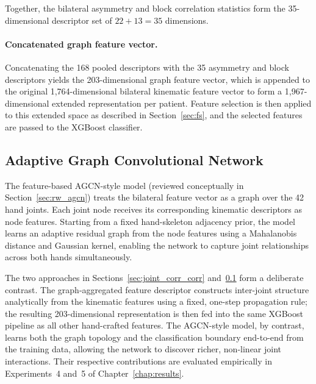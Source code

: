 Together, the bilateral asymmetry and block correlation statistics form the 35-dimensional descriptor set of $22 + 13 = 35$ dimensions.

\paragraph{Concatenated graph feature vector.}
Concatenating the 168 pooled descriptors with the 35 asymmetry and block descriptors yields the 203-dimensional graph feature vector, which is appended to the original 1,764-dimensional bilateral kinematic feature vector to form a 1,967-dimensional extended representation per patient. Feature selection is then applied to this extended space as described in Section~\ref{sec:fs}, and the selected features are passed to the XGBoost classifier.

\subsection{Adaptive Graph Convolutional Network}
\label{sec:joint_corr_agcn}

The feature-based AGCN-style model (reviewed conceptually in Section~\ref{sec:rw_agcn}) treats the bilateral feature vector as a graph over the 42 hand joints. Each joint node receives its corresponding kinematic descriptors as node features. Starting from a fixed hand-skeleton adjacency prior, the model learns an adaptive residual graph from the node features using a Mahalanobis distance and Gaussian kernel, enabling the network to capture joint relationships across both hands simultaneously.

The two approaches in Sections~\ref{sec:joint_corr_corr} and~\ref{sec:joint_corr_agcn} form a deliberate contrast. The graph-aggregated feature descriptor constructs inter-joint structure analytically from the kinematic features using a fixed, one-step propagation rule; the resulting 203-dimensional representation is then fed into the same XGBoost pipeline as all other hand-crafted features. The AGCN-style model, by contrast, learns both the graph topology and the classification boundary end-to-end from the training data, allowing the network to discover richer, non-linear joint interactions. Their respective contributions are evaluated empirically in Experiments~4 and~5 of Chapter~\ref{chap:results}.
